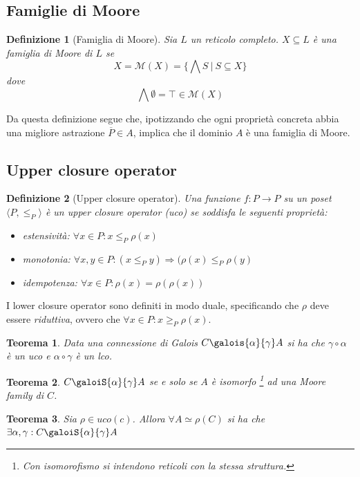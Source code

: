 \documentclass{article}
\newtheorem{definit}{Definizione}[subsection]
\newtheorem{thm}{Teorema}[subsection]
\begin{document}
        \subsection{Famiglie di Moore}
            \begin{definit}[Famiglia di Moore]
                Sia $L$ un reticolo completo. $X \subseteq L$ è una famiglia di Moore di $L$ se \[ X = \mathcal{M}(X) = \Big\{ \bigwedge S\ \vert\ S \subseteq X \Big\} \] dove \[ \bigwedge \emptyset = \top \in \mathcal{M}(X) \]
            \end{definit}
            
            Da questa definizione segue che, ipotizzando che ogni proprietà concreta abbia una migliore astrazione $\overline{P} \in A$, implica che il dominio $A$ è una famiglia di Moore.
            
        \subsection{Upper closure operator}
            \begin{definit}[Upper closure operator]
                Una funzione $f:P \to P$ su un poset $\langle P, \leq_P \rangle $ è un upper closure operator (uco) se soddisfa le seguenti proprietà:\begin{itemize}
                    \item estensività: $\forall x \in P: x \leq_P \rho(x)$
                    \item monotonia: $\forall x,y \in P: (x \leq_P y) \Rightarrow (\rho(x) \leq_P \rho(y)$
                    \item idempotenza: $\forall x \in P: \rho(x) = \rho(\rho(x))$
                \end{itemize}
            \end{definit}

            I lower closure operator sono definiti in modo duale, specificando che $\rho$ deve essere \textit{riduttiva}, ovvero che $\forall x \in P: x \geq_P \rho(x)$.
            
            \begin{thm}
                Data una connessione di Galois $C \galois{\alpha}{\gamma} A$ si ha che $\gamma \circ \alpha$ è un uco e $\alpha \circ \gamma $ è un lco.
            \end{thm}
            \begin{thm}
                $C \galoiS{\alpha}{\gamma} A$ se e solo se $A$ è isomorfo \footnote{Con isomorofismo si intendono reticoli con la stessa struttura.} ad una Moore family di $C$.
            \end{thm}
            \begin{thm}
                Sia $\rho \in uco(c)$. Allora $\forall A \simeq \rho(C)$ si ha che $\exists \alpha, \gamma : C \galoiS{\alpha}{\gamma} A$
            \end{thm}
        
\end{document}
